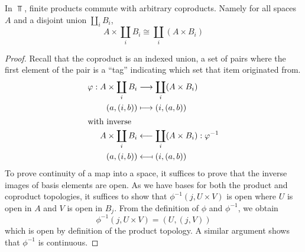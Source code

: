 \documentclass[a5paper]{article}
\begin{document}
\begin{lemma*}
  In $\Top$, finite products commute with arbitrary coproducts. Namely for all
  spaces $A$ and a disjoint union $\coprod_i B_i$,
  \begin{equation*}
    A\times \coprod_i B_i\cong \coprod_i (A\times B_i)
  \end{equation*}
\end{lemma*}
\begin{proof}
  Recall that the coproduct is an indexed union, a set of pairs where the first
  element of the pair is a ``tag'' indicating which set that item originated from.
  \begin{align*}
    \phi:A\times\coprod_i B_i &\longrightarrow \coprod_i (A\times B_i) \\
    (a,(i,b))&\longmapsto (i,(a,b)) \\
  \intertext{with inverse}
    A\times\coprod_i B_i &\longleftarrow \coprod_i (A\times B_i):\phi^{-1} \\
    (a,(i,b))&\longmapsfrom (i,(a,b)) 
  \end{align*}
  To prove continuity of a map into a space, it suffices to prove that the
  inverse images of basis elements are open. As we have bases for both the
  product and coproduct topologies, it suffices to show that 
  $\phi^{-1}(j,U\times V)$ is open where $U$ is open in $A$ and $V$ is open in
  $B_j$. From the definition of $\phi$ and $\phi^{-1}$, we obtain
  \begin{equation*}
    \phi^{-1}(j,U\times V) = (U,(j,V))
  \end{equation*}
  which is open by definition of the product topology. A similar argument shows
  that $\phi^{-1}$ is continuous.
\end{proof}
\end{document}
